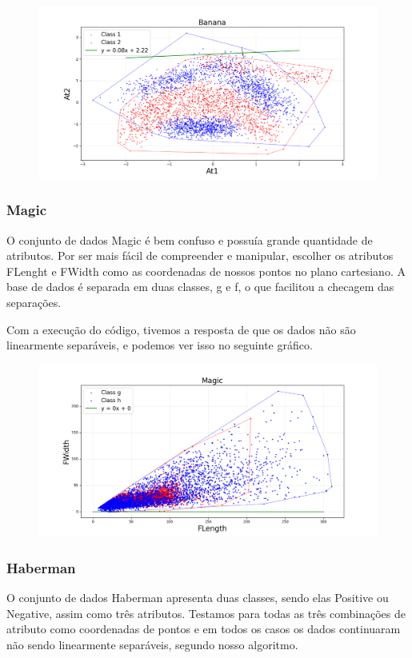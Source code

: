 \documentclass{article}
\begin{document}
\begin{figure} [H]
	\includegraphics[width=12cm]{banana.png}
	\centering
\end{figure}

\subsubsection{Magic}

O conjunto de dados Magic é bem confuso e possuía grande quantidade de atributos. Por ser mais fácil de compreender e manipular, escolher os atributos FLenght e FWidth como as coordenadas de nossos pontos no plano cartesiano. A base de dados é separada em duas classes, g e f, o que facilitou a checagem das separações.

Com a execução do código, tivemos a resposta de que os dados não são linearmente separáveis, e podemos ver isso no seguinte gráfico.

\begin{figure} [H]
	\includegraphics[width=12cm]{magic.png}
	\centering
\end{figure}

\subsubsection{Haberman}

O conjunto de dados Haberman apresenta duas classes, sendo elas Positive ou Negative, assim como três atributos. Testamos para todas as três combinações de atributo como coordenadas de pontos e em todos os casos os dados continuaram não sendo linearmente separáveis, segundo nosso algoritmo.
\end{document}
